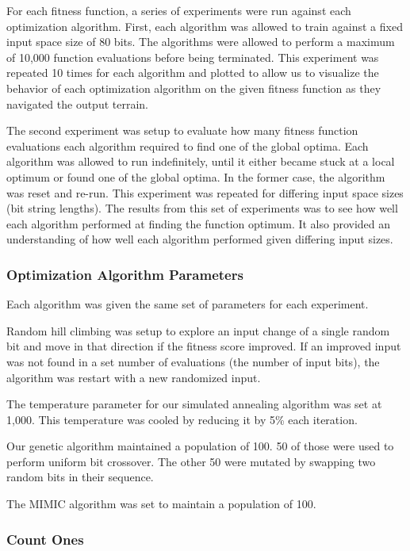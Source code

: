 \documentclass{sig-alternate}
\begin{document}
For each fitness function, a series of experiments were run against each optimization algorithm. First, each algorithm was allowed to train against a fixed input space size of 80 bits. The algorithms were allowed to perform a maximum of 10,000 function evaluations before being terminated. This experiment was repeated 10 times for each algorithm and plotted to allow us to visualize the behavior of each optimization algorithm on the given fitness function as they navigated the output terrain.

The second experiment was setup to evaluate how many fitness function evaluations each algorithm required to find one of the global optima. Each algorithm was allowed to run indefinitely, until it either became stuck at a local optimum or found one of the global optima. In the former case, the algorithm was reset and re-run. This experiment was repeated for differing input space sizes (bit string lengths). The results from this set of experiments was to see how well each algorithm performed at finding the function optimum. It also provided an understanding of how well each algorithm performed given differing input sizes.

\subsubsection{Optimization Algorithm Parameters}

Each algorithm was given the same set of parameters for each experiment. 

Random hill climbing was setup to explore an input change of a single random bit and move in that direction if the fitness score improved. If an improved input was not found in a set number of evaluations (the number of input bits), the algorithm was restart with a new randomized input.

The temperature parameter for our simulated annealing algorithm was set at 1,000. This temperature was cooled by reducing it by 5\% each iteration. 

Our genetic algorithm maintained a population of 100. 50 of those were used to perform uniform bit crossover. The other 50 were mutated by swapping two random bits in their sequence.

The MIMIC algorithm was set to maintain a population of 100.


\subsubsection{Count Ones}
\end{document}
